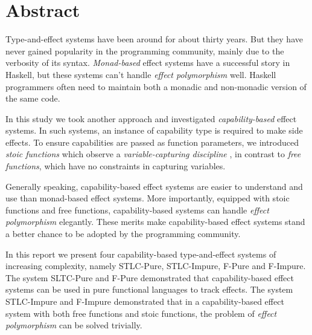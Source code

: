 \section*{\centering Abstract}

Type-and-effect systems have been around for about thirty years. But
they have never gained popularity in the programming community, mainly
due to the verbosity of its syntax. \emph{Monad-based} effect systems
have a successful story in Haskell, but these systems can't handle
\emph{effect polymorphism} well.  Haskell programmers often need to
maintain both a monadic and non-monadic version of the same code.

In this study we took another approach and investigated
\emph{capability-based} effect systems. In such systems, an instance
of capability type is required to make side effects. To ensure
capabilities are passed as function parameters, we introduced
\emph{stoic functions} which observe a \emph{variable-capturing
  discipline} , in contrast to \emph{free functions}, which have no
constraints in capturing variables.

Generally speaking, capability-based effect systems are easier to
understand and use than monad-based effect systems. More importantly,
equipped with stoic functions and free functions, capability-based
systems can handle \emph{effect polymorphism} elegantly. These merits
make capability-based effect systems stand a better chance to be
adopted by the programming community.

In this report we present four capability-based type-and-effect
systems of increasing complexity, namely STLC-Pure, STLC-Impure,
F-Pure and F-Impure.  The system SLTC-Pure and F-Pure demonstrated
that capability-based effect systems can be used in pure functional
languages to track effects. The system STLC-Impure and F-Impure
demonstrated that in a capability-based effect system with both free
functions and stoic functions, the problem of \emph{effect
  polymorphism} can be solved trivially.
